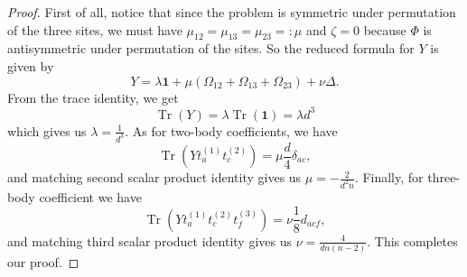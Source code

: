 \documentclass[10pt,twocolumn,superscriptaddress,aps,amsmath,amssymb,citeautoscript,floatfix,prx]{revtex4-2}
\theoremstyle{plain}
\theoremstyle{plain}
\theoremstyle{plain}
\theoremstyle{plain}
\theoremstyle{plain}
\theoremstyle{plain}
\theoremstyle{plain}
\theoremstyle{definition}
\theoremstyle{plain}
\begin{document}
\begin{appendix}
\begin{proof}
    First of all, notice that since the problem is symmetric under permutation of the three sites, we must have $\mu_{12}=\mu_{13}=\mu_{23}=: \mu$ 
    and $\zeta=0$ because $\Phi$ is antisymmetric under permutation of the sites. So the reduced formula for $Y$ is given by
    \[
        Y=\lambda \mathbf{1}+\mu\left(\Omega_{12}+\Omega_{13}+\Omega_{23}\right)+\nu \Delta.
    \]
    From the trace identity, we get
    \[
        \operatorname{Tr}(Y)=\lambda \operatorname{Tr}(\mathbf{1})=\lambda d^3
    \]
    which gives us $\lambda=\frac{1}{d^3}$.
    As for two-body coefficients, we have
    \[
        \operatorname{Tr}\left(Y t_a^{(1)} t_c^{(2)}\right)=\mu \frac{d}{4} \delta_{a c},
    \]
    and matching second scalar product identity gives us $\mu=-\frac{2}{d^2 n}$.
    Finally, for three-body coefficient we have
    \[
        \operatorname{Tr}\left(Y t_a^{(1)} t_c^{(2)} t_f^{(3)}\right)=\nu \frac{1}{8} d_{a c f},
    \]
    and matching third scalar product identity gives us $\nu=\frac{4}{d n(n-2)}$.
    This completes our proof.
\end{proof}


\end{appendix}
\end{document}
